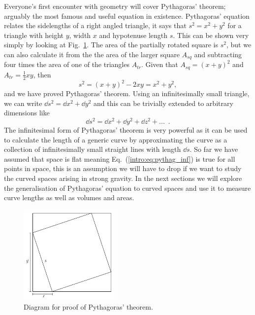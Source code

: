 Everyone's first encounter with geometry will cover Pythagoras' theorem; arguably the most famous and useful equation in existence. Pythagoras' equation relates the sidelengths of a right angled triangle, it says that $s^2 = x^2 + y^2$ for a triangle with height $y$, width $x$ and hypotenuse length $s$. This can be shown very simply by looking at Fig.~\ref{intro:fig:pythag_proof}. The area of the partially rotated square is $s^2$, but we can also calculate it from the the area of the larger square $A_{sq}$ and subtracting four times the area of one of the triangles $A_{tr}$. Given that $A_{sq} = (x+y)^2$ and $A_{tr} = \frac{1}{2}xy$, then 
\begin{equation}
s^2 = (x+y)^2-2xy = x^2 + y^2,
\end{equation}
and we have proved Pythagoras' theorem. Using an infinitesimally small triangle, we can write $\dd s^2 = \dd x^2 + \dd y^2$ and this can be trivially extended to arbitrary dimensions like
\begin{equation}\label{intro:eq:pythag_inf}
\dd s^2 = \dd x^2 + \dd y^2 + \dd z^2 + ...\,\,\,.
\end{equation}
The infinitesimal form of Pythagoras' theorem is very powerful as it can be used to calculate the length of a generic curve by approximating the curve as a collection of infinitesimally small straight lines with length $\dd s$. So far we have assumed that space is flat meaning Eq.~(\ref{intro:eq:pythag_inf}) is true for all points in space, this is an assumption we will have to drop if we want to study the curved spaces arising in strong gravity. In the next sections we will explore the generalisation of Pythagoras' equation to curved spaces and use it to measure curve lengths as well as volumes and areas.

\begin{figure}[h]
\centering
    \includegraphics[width=0.45\textwidth]{pics/pythag_proof2.png}
    \caption{Diagram for proof of Pythagoras' theorem.}
    \label{intro:fig:pythag_proof}
\end{figure}


